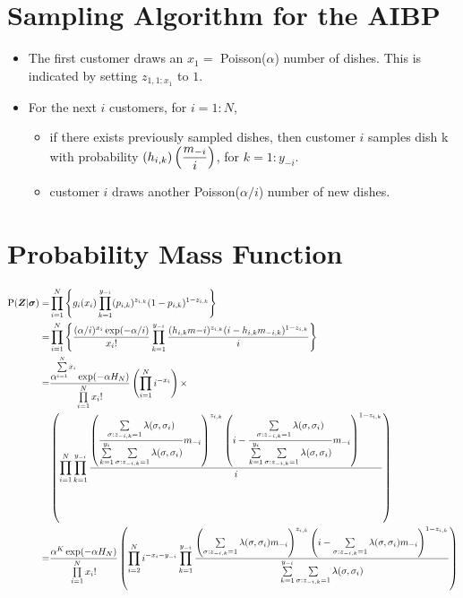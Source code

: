 \section{Sampling Algorithm for the AIBP}
\begin{itemize}
  \item The first customer draws an $x_1=$ Poisson($\alpha$) number of dishes. This
        is indicated by setting $z_{1,1:x_1}$ to $1$.
  \item For the next $i$ customers, for $i=1:N$, 
     \begin{itemize}
       \item if there exists previously sampled dishes, then customer $i$
             samples dish k with probability $\left(h_{i,k}\right) 
             \left(\displaystyle\frac{m_{-i}}{i}\right)$, for $ k = 1:y_{-i}$.
       \item customer $i$ draws another Poisson($\alpha/i$) number of new dishes.
     \end{itemize}
\end{itemize}


\section{Probability Mass Function}
\begin{align*}
  \text{P}(\bm Z|\bm\sigma)
  =&\prod\limits_{i=1}^{N} \left\{g_i(x_i) \prod\limits_{k=1}^{y_{-i}} 
    (p_{i,k})^{z_{i,k}}(1-p_{i,k})^{1-z_{i,k}}\right\}\\
  =&\prod\limits_{i=1}^{N} \left\{ \displaystyle\frac{(\alpha/i)^{x_i}\exp(-\alpha/i)}{x_i!} 
    \prod\limits_{k=1}^{y_{-i}} 
    \displaystyle\frac{(h_{i,k}m{-i})^{z_{i,k}}(i-h_{i,k}m_{-i,k})^{1-z_{i,k}}}{i} 
    \right\} \\
  =&\displaystyle\frac{\alpha^{\sum\limits_{i=1}^{N}x_i} \exp(-\alpha H_N)} {\prod\limits_{i=1}^{N}x_i!} 
    \left( \prod\limits_{i=1}^{N}i^{-x_i} \right) \times
    \\
    &\left( \prod\limits_{i=1}^{N}\prod\limits_{k=1}^{y_{-i}} 
    \displaystyle\frac{\left(\displaystyle\frac{\sum\limits_{\sigma:z_{-i,k}=1}^{}\lambda(\sigma,\sigma_i)} {\sum\limits_{k=1}^{y_i}\sum\limits_{\sigma:z_{-i,k}=1}^{}\lambda(\sigma,\sigma_i)} m_{-i}\right)^{z_{i,k}}
             \left(i-\displaystyle\frac{\sum\limits_{\sigma:z_{-i,k}=1}^{}\lambda(\sigma,\sigma_i)} {\sum\limits_{k=1}^{y_i}\sum\limits_{\sigma:z_{-i,k}=1}^{}\lambda(\sigma,\sigma_i)} m_{-i}\right)^{1-z_{i,k}}}{i} \right)\\
  =&\displaystyle\frac{\alpha^K \exp(-\alpha H_N)} {\prod\limits_{i=1}^{N}x_i!} 
    \left( \prod\limits_{i=2}^{N} i^{-x_i-y_{-i}}\prod\limits_{k=1}^{y_{-i}} 
    \displaystyle\frac{
    \left(\sum\limits_{\sigma:z_{-i,k}=1}^{}\lambda(\sigma,\sigma_i)m_{-i}\right)^{z_{i,k}}
    \left(i-\sum\limits_{\sigma:z_{-i,k}=1}^{}
    \lambda(\sigma,\sigma_i)m_{-i}\right)^{1-z_{i,k}}
    }
    {\sum\limits_{k=1}^{y_{-i}}\sum\limits_{\sigma:z_{-i,k}=1}^{}\lambda(\sigma,\sigma_i)}\right)
\end{align*}


